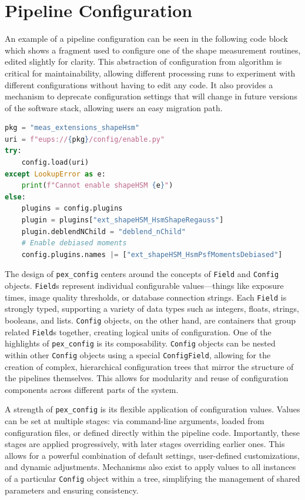 \section{Pipeline Configuration}
\label{sec:appendix_config}

An example of a pipeline configuration can be seen in the following code block which shows a fragment used to configure one of the shape measurement routines, edited slightly for clarity.
This abstraction of configuration from algorithm is critical for maintainability, allowing different processing runs to experiment with different configurations without having to edit any code.
It also provides a mechanism to deprecate configuration settings that will change in future versions of the software stack, allowing users an easy migration path.

\begin{minipage}{\columnwidth}
    \begin{lstlisting}[caption=Code configuration in Python, language=python]
pkg = "meas_extensions_shapeHsm"
uri = f"eups://{pkg}/config/enable.py"
try:
    config.load(uri)
except LookupError as e:
    print(f"Cannot enable shapeHSM {e}")
else:
    plugins = config.plugins
    plugin = plugins["ext_shapeHSM_HsmShapeRegauss"]
    plugin.deblendNChild = "deblend_nChild"
    # Enable debiased moments
    config.plugins.names |= ["ext_shapeHSM_HsmPsfMomentsDebiased"]
    \end{lstlisting}
\end{minipage}

The design of \texttt{pex\_config} centers around the concepts of \texttt{Field} and \texttt{Config} objects.
\texttt{Field}s represent individual configurable values---things like exposure times, image quality thresholds, or database connection strings.
Each \texttt{Field} is strongly typed, supporting a variety of data types such as integers, floats, strings, booleans, and lists.
\texttt{Config} objects, on the other hand, are containers that group related \texttt{Field}s together, creating logical units of configuration.
One of the highlights of \texttt{pex\_config} is its composability.
\texttt{Config} objects can be nested within other \texttt{Config} objects using a special \texttt{ConfigField}, allowing for the creation of complex, hierarchical configuration trees that mirror the structure of the pipelines themselves.
This allows for modularity and reuse of configuration components across different parts of the system.

A strength of \texttt{pex\_config} is its flexible application of configuration values.
Values can be set at multiple stages: via command-line arguments, loaded from configuration files, or defined directly within the pipeline code.
Importantly, these stages are applied progressively, with later stages overriding earlier ones.
This allows for a powerful combination of default settings, user-defined customizations, and dynamic adjustments.
Mechanisms also exist to apply values to all instances of a particular \texttt{Config} object within a tree, simplifying the management of shared parameters and ensuring consistency.

